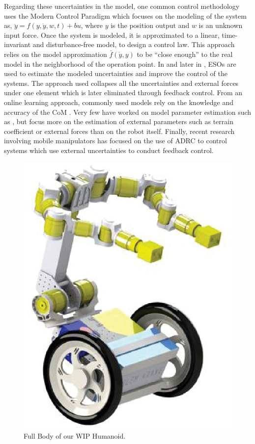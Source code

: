 \documentclass[letterpaper, 10 pt, conference]{ieeeconf}
\begin{document}
Regarding these uncertainties in the model, one common control methodology uses
the Modern Control Paradigm \cite{Gao2006} which focuses on the modeling of the
system as, $\ddot{y} = f(y,\dot{y},w,t) + bu$, where $y$ is the position output
and $w$ is an unknown input force. Once the system is modeled, it is
approximated to a linear, time-invariant and disturbance-free model, to design a
control law. This approach relies on the model approximation
$\bar{f}(\dot{y},y)$ to be ``close enough'' to the real model in the
neighborhood of the operation point. In \cite{Gao2006} and later in
\cite{canete2012disturbance}, \acp{ESO} are used to estimate the modeled
uncertainties and improve the control of the systems. The approach used
collapses all the uncertainties and external forces under one element which is
later eliminated through feedback control.  From an online learning approach,
commonly used models rely on the knowledge and accuracy of the \ac{CoM}
\cite{Luo2012,Chen2017,Yang2016}. Very few have worked on model parameter
estimation such as \cite{Kim2016,Jamone2014}, but focus more on the estimation
of external parameters such as terrain coefficient or external forces than on
the robot itself. Finally, recent research involving mobile manipulators has
focused on the use of \ac{ADRC} \cite{Jiang2016,Ruan2014,Wei2017} to control
systems which use external uncertainties to conduct feedback control.

\begin{figure}[t]
	\centering
	\includegraphics[width=0.4\columnwidth, clip]{figs/System1.eps}
	\vspace{-0.5\baselineskip}
   \caption{Full Body of our WIP Humanoid.}
   \label{fig: system1}
\end{figure}
\end{document}

